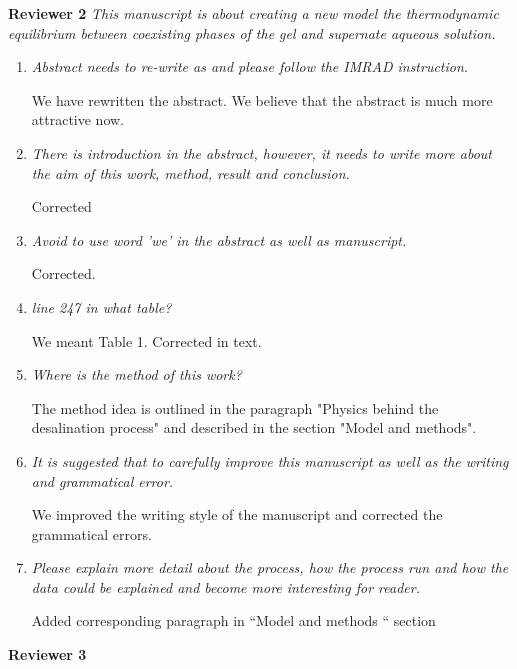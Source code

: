 \documentclass[12pt]{dinbrief}
\begin{document}
\textbf{Reviewer 2}
\textit{This manuscript is about creating a new model the thermodynamic equilibrium between coexisting phases of the gel and supernate aqueous solution.}
\begin{enumerate}

\item \textit{Abstract needs to re-write as and please follow the IMRAD instruction.}

We have rewritten the abstract. We believe that the abstract is much more attractive now.
\item \textit{There is introduction in the abstract, however, it needs to write more about the aim of this work, method, result and conclusion.}

Corrected
\item \textit{Avoid to use word 'we' in the abstract as well as manuscript.}

Corrected.
\item \textit{line 247 in what table?}

We meant Table 1. Corrected in text.
\item \textit{Where is the method of this work?} 

The method idea is outlined in the paragraph "Physics behind the desalination process" and described in the section "Model and methods". 
\item \textit{It is suggested that to carefully improve this manuscript as well as the writing and grammatical error.}

We improved the writing style of the manuscript and corrected the grammatical errors.

\item \textit{Please explain more detail about the process, how the process run and how the data could be explained and become more interesting for reader.}

Added corresponding paragraph in ``Model and methods `` section

\end{enumerate}


\textbf{Reviewer 3}
\end{document}
